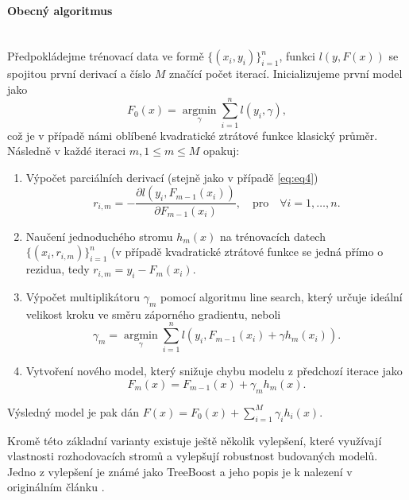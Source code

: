 \documentclass[a4paper]{article}
\begin{document}
\paragraph{Obecný algoritmus} \mbox{} \\
Předpokládejme trénovací data ve formě $\{(x_i, y_i) \}_{i=1}^n$, funkci $l(y, F(x))$ se spojitou první derivací a číslo $M$ značící počet iterací. Inicializujeme první model jako
    \begin{equation}
        F_0(x) = \operatorname*{argmin}_\gamma \sum\limits_{i=1}^n l(y_i, \gamma),
    \end{equation}
což je v případě námi oblíbené kvadratické ztrátové funkce klasický průměr. 
Následně v každé iteraci $m, 1 \leq m \leq M$ opakuj:
\begin{enumerate}
\item Výpočet parciálních derivací (stejně jako v případě \eqref{eq:eq4})
    \begin{equation}
         r_{i,m} = - \frac{\partial  l(y_i, F_{m-1}(x_i))}{\partial F_{m-1}(x_i)}, \quad \textrm{pro} \quad \forall i = 1, \dots ,n.
    \end{equation} 
\item Naučení jednoduchého stromu $h_m(x)$ na trénovacích datech $\{(x_i, r_{i,m}) \}_{i=1}^n$ (v případě kvadratické ztrátové funkce se jedná přímo o rezidua, tedy $ r_{i,m} = y_i - F_m(x_i)$.
\item Výpočet multiplikátoru $\gamma_m$ pomocí algoritmu line search, který určuje ideální velikost kroku ve směru záporného gradientu, neboli 
    \begin{equation}
        \gamma_m =  \operatorname*{argmin}_\gamma \sum\limits_{i=1}^n l(y_i, F_{m-1}(x_i) + \gamma h_m(x_i)).
    \end{equation} 
\item Vytvoření nového model, který snižuje chybu modelu z předchozí iterace jako
    \begin{equation}\label{eq:eq10}
        F_m(x) = F_{m-1}(x) + \gamma_m h_m(x).
    \end{equation} 
\end{enumerate}
Výsledný model je pak dán $F(x) = F_0(x) +  \sum\limits_{i=1}^M \gamma_i h_i(x)$.

Kromě této základní varianty existuje ještě několik vylepšení, které využívají vlastnosti rozhodovacích stromů a vylepšují robustnost budovaných modelů. Jedno z vylepšení je známé jako TreeBoost a jeho popis je k nalezení v originálním článku \cite{friedman2001greedy}. 
\end{document}
